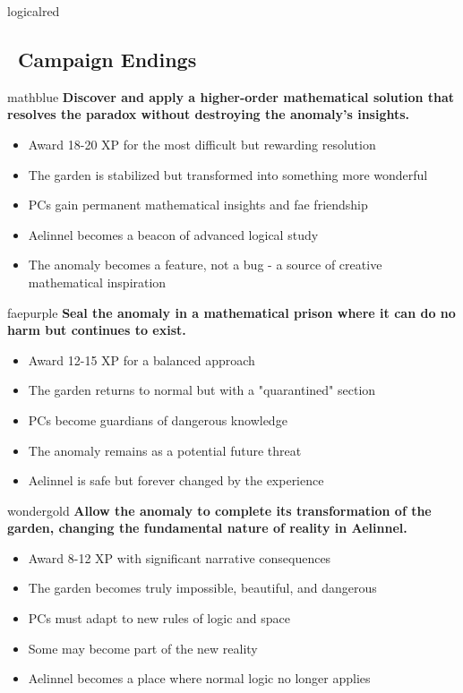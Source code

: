 \documentclass[11pt]{article}
\begin{document}
\begin{campaignsection}{logicalred}
\subsection*{\faDoorOpen\ Campaign Endings}

\begin{clockbox}{mathblue}
\textbf{Discover and apply a higher-order mathematical solution that resolves the paradox without destroying the anomaly's insights.}
\begin{itemize}
    \item Award 18-20 XP for the most difficult but rewarding resolution
    \item The garden is stabilized but transformed into something more wonderful
    \item PCs gain permanent mathematical insights and fae friendship
    \item Aelinnel becomes a beacon of advanced logical study
    \item The anomaly becomes a feature, not a bug - a source of creative mathematical inspiration
\end{itemize}
\end{clockbox}

\begin{clockbox}{faepurple}
\textbf{Seal the anomaly in a mathematical prison where it can do no harm but continues to exist.}
\begin{itemize}
    \item Award 12-15 XP for a balanced approach
    \item The garden returns to normal but with a "quarantined" section
    \item PCs become guardians of dangerous knowledge
    \item The anomaly remains as a potential future threat
    \item Aelinnel is safe but forever changed by the experience
\end{itemize}
\end{clockbox}

\begin{clockbox}{wondergold}
\textbf{Allow the anomaly to complete its transformation of the garden, changing the fundamental nature of reality in Aelinnel.}
\begin{itemize}
    \item Award 8-12 XP with significant narrative consequences
    \item The garden becomes truly impossible, beautiful, and dangerous
    \item PCs must adapt to new rules of logic and space
    \item Some may become part of the new reality
    \item Aelinnel becomes a place where normal logic no longer applies
\end{itemize}
\end{clockbox}


\end{campaignsection}
\end{document}
